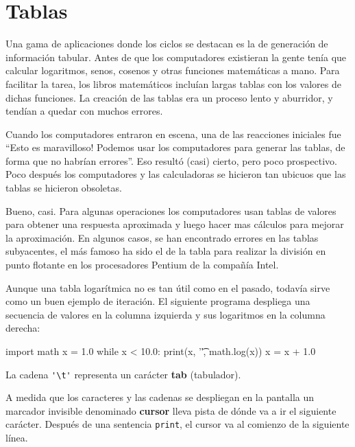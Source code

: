 \section{Tablas}

\label{tables}  

Una gama de aplicaciones donde los ciclos se destacan es la de generación
de información tabular. Antes de que los computadores existieran la
gente tenía que calcular logaritmos, senos, cosenos y otras funciones
matemáticas a mano. Para facilitar la tarea, los libros matemáticos
incluían largas tablas con los valores de dichas funciones. La creación
de las tablas era un proceso lento y aburridor, y tendían a quedar
con muchos errores.

Cuando los computadores entraron en escena, una de las reacciones
iniciales fue ``Esto es maravilloso! Podemos usar los computadores
para generar las tablas, de forma que no habrían errores''. Eso resultó
(casi) cierto, pero poco prospectivo. Poco después los computadores
y las calculadoras se hicieron tan ubicuos que las tablas se hicieron
obsoletas.

Bueno, casi. Para algunas operaciones los computadores usan tablas
de valores para obtener una respuesta aproximada y luego hacer mas
cálculos para mejorar la aproximación. En algunos casos, se han encontrado
errores en las tablas subyacentes, el más famoso ha sido el de la
tabla para realizar la división en punto flotante en los procesadores
Pentium de la compañía Intel.

 

Aunque una tabla logarítmica no es tan útil como en el pasado, todavía
sirve como un buen ejemplo de iteración. El siguiente programa despliega
una secuencia de valores en la columna izquierda y sus logaritmos
en la columna derecha: 
\begin{pythoncode}
import math
x = 1.0
while x < 10.0:
  print(x, '\t', math.log(x))
  x = x + 1.0
\end{pythoncode}

La cadena \verb+'\t'+ representa un carácter \textbf{tab} (tabulador).

A medida que los caracteres y las cadenas se despliegan en la pantalla
un marcador invisible denominado \textbf{cursor} lleva pista de dónde
va a ir el siguiente carácter. Después de una sentencia \texttt{print},
el cursor va al comienzo de la siguiente línea.

